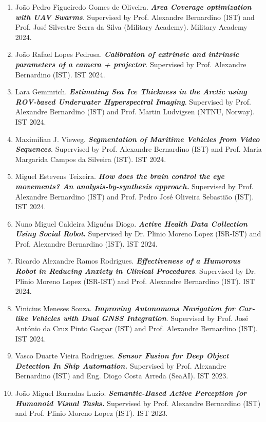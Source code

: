 \begin{enumerate}
  Academy). IST 2024.
\item
  João Pedro Figueiredo Gomes de Oliveira. \emph{\textbf{Area Coverage
  optimization with UAV Swarms}}. Supervised by Prof. Alexandre
  Bernardino (IST) and Prof. José Silvestre Serra da Silva (Military
  Academy). Military Academy 2024.
\item
  João Rafael Lopes Pedrosa. \emph{\textbf{Calibration of extrinsic and
  intrinsic parameters of a camera + projector}}. Supervised by Prof.
  Alexandre Bernardino (IST). IST 2024.
\item
  Lara Gemmrich. \emph{\textbf{Estimating Sea Ice Thickness in the
  Arctic using ROV-based Underwater Hyperspectral Imaging}}. Supervised
  by Prof. Alexandre Bernardino (IST) and Prof. Martin Ludvigsen (NTNU,
  Norway). IST 2024.
\item
  Maximilian J. Vieweg. \emph{\textbf{Segmentation of Maritime Vehicles
  from Video Sequences}}. Supervised by Prof. Alexandre Bernardino (IST)
  and Prof. Maria Margarida Campos da Silveira (IST). IST 2024.
\item
  Miguel Estevens Teixeira. \emph{\textbf{How does the brain control the
  eye movements? An analysis-by-synthesis approach.}} Supervised by
  Prof. Alexandre Bernardino (IST) and Prof. Pedro José Oliveira
  Sebastião (IST). IST 2024.
\item
  Nuno Miguel Caldeira Miguéns Diogo. \textbf{\emph{Active Health Data
  Collection Using Social Robot}.} Supervised by Dr. Plinio Moreno Lopez
  (ISR-IST) and Prof. Alexandre Bernardino (IST). IST 2024.
\item
  Ricardo Alexandre Ramos Rodrigues. \emph{\textbf{Effectiveness of a
  Humorous Robot in Reducing Anxiety in Clinical Procedures}}.
  Supervised by Dr. Plinio Moreno Lopez (ISR-IST) and Prof. Alexandre
  Bernardino (IST). IST 2024.
\item
  Vinicius Meneses Souza. \emph{\textbf{Improving Autonomous Navigation
  for Car-like Vehicles with Dual GNSS Integration}}. Supervised by
  Prof. José António da Cruz Pinto Gaspar (IST) and Prof. Alexandre
  Bernardino (IST). IST 2024.
\item
  Vasco Duarte Vieira Rodrigues. \emph{\textbf{Sensor Fusion for Deep
  Object Detection In Ship Automation.}} Supervised by Prof. Alexandre
  Bernardino (IST) and Eng. Diogo Costa Arreda (SeaAI). IST 2023.
\item
  João Miguel Barradas Luzio. \emph{\textbf{Semantic-Based Active
  Perception for Humanoid Visual Tasks.}} Supervised by Prof. Alexandre
  Bernardino (IST) and Prof. Plinio Moreno Lopez (IST). IST 2023.

\end{enumerate}
